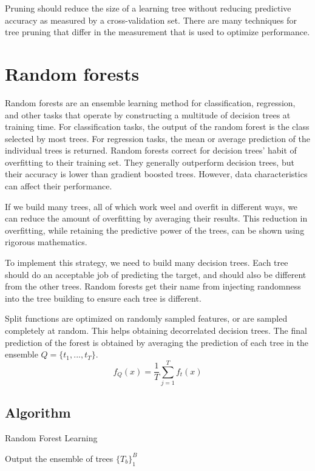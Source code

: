 Pruning should reduce the size of a learning tree without reducing predictive accuracy as measured by a cross-validation set. There are many techniques for tree pruning that differ in the measurement that is used to optimize performance.

\section{Random forests}
Random forests are an ensemble learning method for classification, regression, and other tasks that operate by constructing a multitude of decision trees at training time. For classification tasks, the output of the random forest is the class selected by most trees. For regression tasks, the mean or average prediction of the individual trees is returned. Random forests correct for decision trees' habit of overfitting to their training set. They generally outperform decision trees, but their accuracy is lower than gradient boosted trees. However, data characteristics can affect their performance. 

If we build many trees, all of which work weel and overfit in different ways, we can reduce the amount of overfitting by averaging their results. This reduction in overfitting, while retaining the predictive power of the trees, can be shown using rigorous mathematics.

To implement this strategy, we need to build many decision trees. Each tree should do an acceptable job of predicting the target, and should also be different from the other trees. Random forests get their name from injecting randomness into the tree building to ensure each tree is different.

Split functions are optimized on randomly sampled features, or are sampled completely at random. This helps obtaining decorrelated decision trees. The final prediction of the forest is obtained by averaging the prediction of each tree in the ensemble \(Q = \{t_1,...,t_T\}\).
\begin{equation}
    f_Q(x) = \frac 1 T \sum_{j=1}^T f_t(x)
\end{equation}

\subsection{Algorithm}
\begin{algorithm}[h!]
\caption{Random Forest Learning}
\label{alg:perceptron}
Output the ensemble of trees $\{T_b\}_1^B$\;
\end{algorithm}

